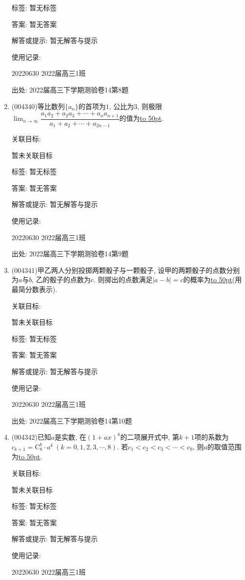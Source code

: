 \documentclass[10pt,a4paper]{article}
\newcommand{\blank}[1]{\underline{\hbox to #1pt{}}}
\begin{document}
\begin{enumerate}[1.]
标签: 暂无标签

答案: 暂无答案

解答或提示: 暂无解答与提示

使用记录:

20220630	2022届高三1班	


出处: 2022届高三下学期测验卷14第8题
\item { (004340)}等比数列$\{a_n\}$的首项为$1$, 公比为$3$, 则极限$\lim_{n\to \infty}\dfrac{a_1a_2+a_2a_3+\cdots+a_na_{n+1}}{a_1+a_2+\cdots+a_{2n-1}}$的值为\blank{50}.


关联目标:

暂未关联目标



标签: 暂无标签

答案: 暂无答案

解答或提示: 暂无解答与提示

使用记录:

20220630	2022届高三1班	


出处: 2022届高三下学期测验卷14第9题
\item { (004341)}甲乙两人分别投掷两颗骰子与一颗骰子, 设甲的两颗骰子的点数分别为$a$与$b$, 乙的骰子的点数为$c$. 则掷出的点数满足$|a-b|=c$的概率为\blank{50}(用最简分数表示).


关联目标:

暂未关联目标



标签: 暂无标签

答案: 暂无答案

解答或提示: 暂无解答与提示

使用记录:

20220630	2022届高三1班	


出处: 2022届高三下学期测验卷14第10题
\item { (004342)}已知$a$是实数, 在$(1+ax)^8$的二项展开式中, 第$k+1$项的系数为$c_{k+1}=\mathrm{C}_8^k\cdot a^k \ (k=0,1,2,3,\cdots,8)$. 若$c_1<c_2<c_3<\cdots<c_9$, 则$a$的取值范围为\blank{50}.


关联目标:

暂未关联目标



标签: 暂无标签

答案: 暂无答案

解答或提示: 暂无解答与提示

使用记录:

20220630	2022届高三1班	



\end{enumerate}
\end{document}
